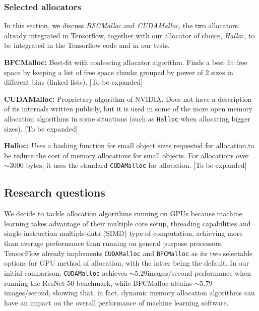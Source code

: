 \documentclass[12pt,twoside]{article}
\newcommand{\resnettimebfc}{$5.79$}     %
\newcommand{\resnettimecuda}{$5.29$}    %
\begin{document}
\subsubsection*{Selected allocators}

In this section, we discuss \textit{BFCMalloc} and \textit{CUDAMalloc}, the two allocators already integrated in Tensorflow, together with our allocator of choice, \textit{Halloc}, to be integrated in the Tensorflow code and in our tests.

\textbf{BFCMalloc:} Best-fit with coalescing allocator algorithm. Finds a best fit free space by keeping a list of free space chunks grouped by power of 2 sizes in different bins (linked lists).
[To be expanded]

\textbf{CUDAMalloc:} Proprietary algorithm of NVIDIA. Does not have a description of its internals written publicly, but it is used in some of the more open memory allocation algorithms in some situations (such as \texttt{Halloc} when allocating bigger sizes).
[To be expanded]

\textbf{Halloc:} Uses a hashing function for small object sizes requested for allocation,to be reduce the cost of memory allocations for small objects. For allocations over $\sim3000$ bytes, it uses the standard \texttt{CUDAMalloc} for allocation.
[To be expanded]



\subsection{Research questions}
\label{sec:questions}

We decide to tackle allocation algorithms running on GPUs because machine learning takes advantage of their multiple core setup, threading capabilities and single-instruction multiple-data (SIMD) type of computation, achieving more than average performance than running on general purpose processors. TensorFlow already implements \texttt{CUDAMalloc} and \texttt{BFCMalloc} as its two selectable options for GPU method of allocation, with the latter being the default. In our initial comparison, \texttt{CUDAMalloc} achieves ${\sim}$\resnettimecuda images/second performance when running the ResNet-50 benchmark, while BFCMalloc attains ${\sim}$\resnettimebfc images/second, showing that, in fact, dynamic memory allocation algorithms can have an impact on the overall performance of machine learning software.
\end{document}
